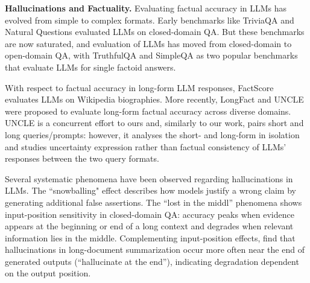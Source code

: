 \documentclass[11pt]{article}
\newcommand{\rparagraph}[1]{\vspace{1.2mm}\noindent\textbf{#1}}
\begin{document}
\rparagraph{Hallucinations and Factuality.} Evaluating factual accuracy in LLMs has evolved from simple to complex formats. Early benchmarks like TriviaQA \citep{joshi2017triviaqa} and Natural Questions \cite{kwiatkowski-etal-2019-natural} evaluated LLMs on closed-domain QA. But these benchmarks are now saturated, and evaluation of LLMs has moved from closed-domain to open-domain QA, with TruthfulQA \cite{lin2022truthfulqa} and SimpleQA \cite{wei2024measuring} as two popular benchmarks that evaluate LLMs for single factoid answers.

With respect to factual accuracy in long-form LLM responses, FactScore \cite{min2023factscore} evaluates LLMs on Wikipedia biographies. More recently, LongFact \cite{wei2024long} and UNCLE \cite{yang2025hallucinate} were proposed to evaluate long-form factual accuracy across diverse domains. UNCLE is a concurrent effort to ours and, similarly to our work, pairs short and long queries/prompts: however, it analyses the short- and long-form in isolation and studies uncertainty expression rather than factual consistency of LLMs' responses between the two query formats. 

Several systematic phenomena have been observed regarding hallucinations in LLMs. The ``snowballing" effect \cite{zhang2024how} describes how models justify a wrong claim by generating additional false assertions. The ``lost in the middl'' phenomena \cite{liu-etal-2024-lost} shows input-position sensitivity in closed-domain QA: accuracy peaks when evidence appears at the beginning or end of a long context and degrades when relevant information lies in the middle. Complementing input-position effects, \citet{yang2025hallucinate} find that hallucinations in long-document summarization occur more often near the end of generated outputs (``hallucinate at the end''), indicating degradation dependent on the output position. 
\end{document}

